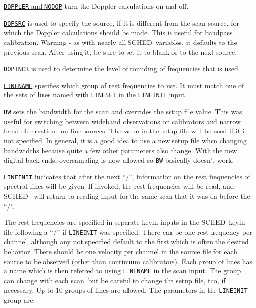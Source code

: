 \documentclass{report}
\newcommand{\sched}{{\sc SCHED}}
\newcommand{\schedb}{{\sc SCHED~}}
\begin{document}
\begin{list}{}{\parsep 0em  \itemsep 0em }
\item 
{\hyperref[MP:DOPPLER]{{\tt DOPPLER} and {\tt NODOP}}}
turn the Doppler calculations on and off.

\item 
{\hyperref[MP:DOPSRC]{{\tt DOPSRC}}} is used to specify the source,
if it is different from the scan source, for which the Doppler calculations
should be made.  This is useful for bandpass calibration.  Warning -
as with nearly all \sched\ variables, it defaults to the previous scan.
After using it, be sure to set it to blank or to the next source.

\item 
{\hyperref[MP:DOPINCR]{{\tt DOPINCR}}} is used to determine the level
of rounding of frequencies that is used.

\item 
{\hyperref[MP:LINENAME]{{\tt LINENAME}}} specifies which group of
rest frequencies to use. It must match one of the sets of lines
named with {\tt LINESET} in the {\tt LINEINIT} input.

\item 
{\hyperref[MP:BW]{{\tt BW}}} sets the bandwidth for the scan and
overrides the setup file value.  This was useful for switching between
wideband observations on calibrators and narrow band observations on
line sources.  The value in the setup file will be used if it is
not specified.  In general, it is a good idea to use a new
setup file when changing bandwidths because quite a few other
parameters also change.  With the new digital back ends, oversampling
is now allowed so {\tt BW} basically doesn't work.


\item 
{\hyperref[MP:LINEINIT]{{\tt LINEINIT}}} indicates that after the
next ``/'', information on the rest frequencies of spectral lines will
be given.  If invoked, the rest frequencies will be read, and \schedb
will return to reading input for the same scan that it was on before
the ``/''.

\end{list}

The rest frequencies are specified in separate keyin inputs in the
\schedb keyin file following a ``/'' if {\tt LINEINIT} was specified.
There can be one rest frequency per channel, although any not
specified default to the first which is often the desired
behavior. There should be one velocity per channel in the source file
for each source to be observed (other than continuum
calibrators). Each group of lines has a name which is then referred to
using 
{\hyperref[MP:LINENAME]{{\tt LINENAME}}} in the scan input. The
group can change with each scan, but be careful to change the setup
file, too, if necessary.  Up to 10 groups of lines are allowed. The
parameters in the {\tt LINEINIT} group are:
\end{document}
